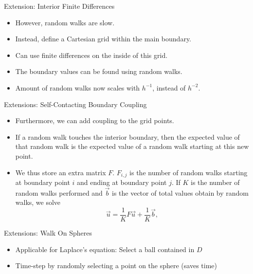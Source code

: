 \documentclass{beamer}
\newcommand\mat[1]{#1}
\begin{document}
\begin{frame}{Extension: Interior Finite Differences}
\begin{itemize}
\item However, random walks are slow.
\item Instead, define a Cartesian grid within the main boundary.
\item Can use finite differences on the inside of this grid.
\item The boundary values can be found using random walks.
\item Amount of random walks now scales with $h^{-1}$, instead of $h^{-2}$.
\end{itemize}
\end{frame}

\begin{frame}{Extensions: Self-Contacting Boundary Coupling}
\begin{itemize}
\item Furthermore, we can add coupling to the grid points.
\item If a random walk touches the interior boundary,
then the expected value of that random walk
is the expected value of a random walk starting at this new point.
\item We thus store an extra matrix $\mat{F}$.
$F_{i,j}$ is the number of random walks starting at boundary point $i$
and ending at boundary point $j$.
If $K$ is the number of random walks performed
and $\vec{b}$ is the vector of total values obtain by random walks,
we solve
$$\vec{u}=\frac{1}{K}\mat{F}\vec{u}+\frac{1}{K}\vec{b},$$
\end{itemize}
\end{frame}

\begin{frame}{Extensions: Walk On Spheres}
\begin{itemize}
	\item Applicable for Laplace's equation: Select a ball contained in $D$ 
	\item Time-step by randomly selecting a point on the sphere (saves time)
\end{itemize}
\end{frame}
\end{document}
